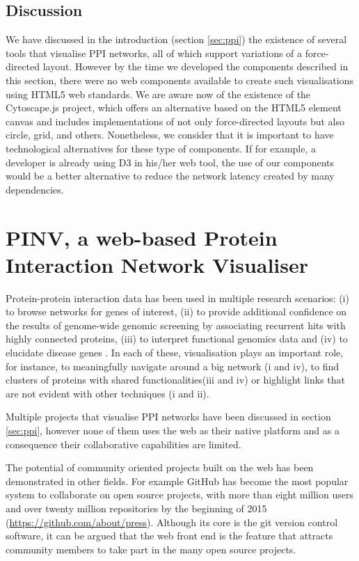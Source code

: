 \subsection{Discussion}
We have discussed in the introduction (section \ref{sec:ppi}) the existence of several tools that visualise PPI networks, all of which support variations of a force-directed layout. However by the time we developed the components described in this section, there were no web components available to create such visualisations using HTML5 web standards. We are aware now of the existence of the Cytoscape.js project, which offers an alternative based on the HTML5 element canvas and includes implementations of not only force-directed layouts but also circle, grid, and others. Nonetheless, we consider that it is important to have technological alternatives for these type of components. If for example, a developer is already using D3 in his/her web tool, the use of our components would be a better alternative to reduce the network latency created by many dependencies.

\newpage





\section{PINV, a web-based Protein Interaction Network Visualiser }  \label{section:pinv}
Protein-protein interaction data has been used in multiple research scenarios: (i) to browse networks for genes of interest, (ii) to provide additional confidence on the results of genome-wide genomic screening by associating recurrent hits with highly connected proteins, (iii) to interpret functional genomics data and (iv) to elucidate disease genes \cite{FRA2013}. In each of these, visualisation plays an important role, for instance,  to meaningfully navigate around a big network (i and iv), to find clusters of proteins with shared functionalities(iii and iv)  or highlight links that are not evident with other techniques (i and ii).

Multiple projects that visualise PPI networks have been discussed in section \ref{sec:ppi}, however none of them uses the web as their native platform and as a consequence their collaborative capabilities are limited.

The potential of community oriented projects built on the web has been demonstrated in other fields. For example GitHub has become the most popular system to collaborate on open source projects, with more than eight million users and over twenty million repositories by the beginning of 2015 (\url{https://github.com/about/press}). Although its core is the git version control software, it can be argued that the web front end is the  feature that attracts  community members to take part in the many open source projects.

